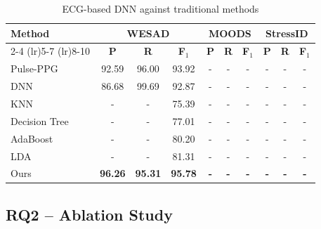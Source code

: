 \documentclass[journal,twoside,web]{ieeecolor}
\begin{document}
\begin{table}[h] %
  \caption{ECG-based DNN against traditional methods}
  \centering %
  \renewcommand{\arraystretch}{1.05}
  \setlength{\tabcolsep}{5pt} %
  \begin{tabular}{lccccccccc} %
    \toprule
    \multirow{2}{*}{\textbf{Method}} 
    & \multicolumn{3}{c}{\textbf{WESAD}}
    & \multicolumn{3}{c}{\textbf{MOODS}} 
    & \multicolumn{3}{c}{\textbf{StressID}} \\
    
    \cmidrule(lr){2-4} \cmidrule(lr){5-7} \cmidrule(lr){8-10}
    
    & \textbf{P} & \textbf{R} & \textbf{F$_1$}
    & \textbf{P} & \textbf{R} & \textbf{F$_1$}
    & \textbf{P} & \textbf{R} & \textbf{F$_1$} \\

    \midrule

    Pulse-PPG & 92.59 & 96.00 & 93.92 & - & - & - & - & - & - \\
    DNN & 86.68 & 99.69 & 92.87 & - & - & - & - & - & - \\
    KNN & - & - & 75.39 & - & - & - & - & - & - \\
    Decision Tree & - & - & 77.01 & - & - & - & - & - & - \\
    AdaBoost & - & - & 80.20 & - & - & - & - & - & - \\
    LDA & - & - & 81.31 & - & - & - & - & - & - \\
    
    \rowcolor{blue!10}
    Ours & \textbf{96.26} & \textbf{95.31} & \textbf{95.78} & \textbf{-} & \textbf{-} & \textbf{-} & \textbf{-} & \textbf{-} & \textbf{-} \\

    \bottomrule
  \end{tabular}
\label{tab:wesad_expt}
\end{table}

\subsection{RQ2 – Ablation Study}
\end{document}
